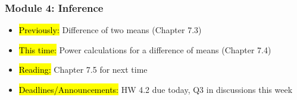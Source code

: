 
\begin{frame}
    \frametitle{Module 4: Inference}
    \begin{itemize}
        \item \hl{Previously: }Difference of two means (Chapter 7.3)
        \item \hl{This time: }Power calculations for a difference of means (Chapter 7.4)
        \item \hl{Reading: }Chapter 7.5 for next time
        \item \hl{Deadlines/Announcements: }HW 4.2 due today, Q3 in discussions this week
    \end{itemize}
    
\end{frame}